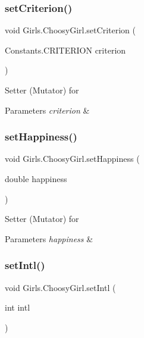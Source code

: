 \subsubsection{\texorpdfstring{set\+Criterion()}{setCriterion()}}
{\footnotesize\ttfamily void Girls.\+Choosy\+Girl.\+set\+Criterion (\begin{DoxyParamCaption}\item[{Constants.\+C\+R\+I\+T\+E\+R\+I\+ON}]{criterion }\end{DoxyParamCaption})\hspace{0.3cm}{\ttfamily [inline]}}

Setter (Mutator) for 
\begin{DoxyParams}{Parameters}
{\em criterion} & \\
\hline
\end{DoxyParams}
\mbox{\label{class_girls_1_1_choosy_girl_a1f59a315a6c00c3f682ba71bf655bafb}} 
\subsubsection{\texorpdfstring{set\+Happiness()}{setHappiness()}}
{\footnotesize\ttfamily void Girls.\+Choosy\+Girl.\+set\+Happiness (\begin{DoxyParamCaption}\item[{double}]{happiness }\end{DoxyParamCaption})\hspace{0.3cm}{\ttfamily [inline]}}

Setter (Mutator) for 
\begin{DoxyParams}{Parameters}
{\em happiness} & \\
\hline
\end{DoxyParams}
\mbox{\label{class_girls_1_1_choosy_girl_ad94e9db0029eeaddc1f2fd8015894b95}} 
\subsubsection{\texorpdfstring{set\+Intl()}{setIntl()}}
{\footnotesize\ttfamily void Girls.\+Choosy\+Girl.\+set\+Intl (\begin{DoxyParamCaption}\item[{int}]{intl }\end{DoxyParamCaption})\hspace{0.3cm}{\ttfamily [inline]}}

